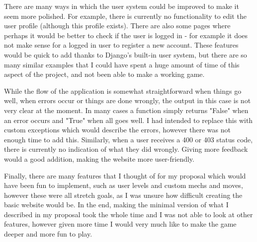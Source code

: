 \documentclass{article}
\begin{document}
There are many ways in which the user system could be improved to make it seem more polished. For example, there is currently no functionality to edit the user profile (although this profile exists). There are also some pages where perhaps it would be better to check if the user is logged in - for example it does not make sense for a logged in user to register a new account. These features would be quick to add thanks to Django's built-in user system, but there are so many similar examples that I could have spent a huge amount of time of this aspect of the project, and not been able to make a working game.

While the flow of the application is somewhat straightforward when things go well, when errors occur or things are done wrongly, the output in this case is not very clear at the moment. In many cases a function simply returns "False" when an error occurs and "True" when all goes well. I had intended to replace this with custom exceptions which would describe the errors, however there was not enough time to add this. Similarly, when a user receives a 400 or 403 status code, there is currently no indication of what they did wrongly. Giving more feedback would a good addition, making the website more user-friendly.

Finally, there are many features that I thought of for my proposal which would have been fun to implement, such as user levels and custom mechs and moves, however these were all stretch goals, as I was unsure how difficult creating the basic website would be. In the end, making the minimal version of what I described in my proposal took the whole time and I was not able to look at other features, however given more time I would very much like to make the game deeper and more fun to play.



\end{document}
